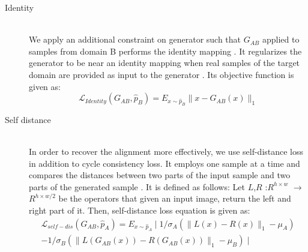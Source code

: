 \begin{description}
\item[Identity  ] \hfill \\ We apply an additional constraint on generator such that $G_{AB}$ applied to samples from domain B performs the identity mapping \cite[]{benaim2017one,taigman2016unsupervised}. It regularizes the generator to be near an identity mapping when real samples of the target domain are provided as input to the generator \cite[]{zhu2017unpaired}. Its objective function is given as:
\begin{equation}
\mathcal L_{Identity}(G_{AB},\hat{p}_B)=E_{x \sim \hat{p}_B}\parallel x-G_{AB}(x) \parallel_1
\label{eq:Identity}
\end{equation}

\item[Self distance  ] \hfill \\ In order to recover the alignment more effectively, we use self-distance loss in addition to cycle consistency loss. It employs one sample at a time and compares the distances between two parts of the input sample and two parts of the generated sample \cite[]{benaim2017one,selfdistance}. It is defined as follows:
Let $L$,$R$ :$R^{h \times w}$ $\rightarrow$ $R^{h \times w/2}$ be the operators that given an input image, return the left and right part of it. Then, self-distance loss equation is given as:
\begin{equation}
\begin{split}
\mathcal L_{self-dis}(G_{AB},\hat{p}_A)=E_{x \sim \hat{p}_A}\mid 1/{\sigma_{A}}(\parallel L(x)-R(x) \parallel_1-\mu_{A})\\-1/\sigma_{B}(\parallel L(G_{AB}(x))-R(G_{AB}(x))\parallel_1-\mu_{B})\mid
\end{split}
\label{eq:selfdis}
\end{equation}
\end{description}


